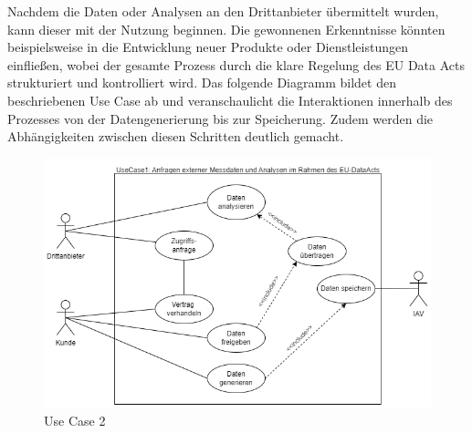   \newline
  Nachdem die Daten oder Analysen an den Drittanbieter übermittelt wurden, kann dieser mit der Nutzung beginnen. Die gewonnenen Erkenntnisse könnten beispielsweise in die Entwicklung neuer Produkte oder Dienstleistungen einfließen, wobei der gesamte Prozess durch die klare Regelung des EU Data Acts strukturiert und kontrolliert wird.
  \newline
  Das folgende Diagramm bildet den beschriebenen Use Case ab und veranschaulicht die Interaktionen innerhalb des Prozesses von der Datengenerierung bis zur Speicherung. Zudem werden die Abhängigkeiten zwischen diesen Schritten deutlich gemacht.
  \begin{figure}[H]
      \centering
      \includegraphics[scale=.6]{media/UseCase1}
      \caption{Use Case 2}
      \label{fig:UseCase1}
  \end{figure}
\newpage
